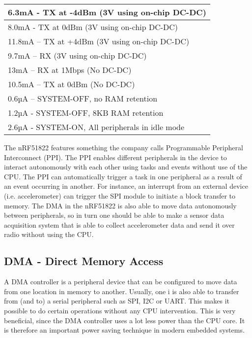 \begin{center}
    \begin{tabular}{| l |}
    \hline
    6.3mA - TX at -4dBm (3V using on-chip DC-DC) \\ \hline
    8.0mA - TX at 0dBm (3V using on-chip DC-DC) \\ \hline
    11.8mA – TX at +4dBm (3V using on-chip DC-DC) \\ \hline
    9.7mA – RX (3V using on-chip DC-DC) \\ \hline
    13mA – RX at 1Mbps (No DC-DC) \\ \hline
    10.5mA – TX at 0dBm (No DC-DC) \\ \hline
    0.6µA – SYSTEM-OFF, no RAM retention \\ \hline
    1.2µA - SYSTEM-OFF, 8KB RAM retention \\ \hline
    2.6µA - SYSTEM-ON, All peripherals in idle mode \\ \hline
    \end{tabular}
\end{center}

The nRF51822 features something the company calls Programmable Peripheral Interconnect (PPI). The PPI enables different peripherals in the device to interact autonomously with each other using tasks and events without use of the CPU. The PPI can automatically trigger a task in one peripheral as a result of an event occurring in another. For instance, an interrupt from an external device (i.e. accelerometer) can trigger the SPI module to initiate a block transfer to memory. The DMA in the nRF51822 is also able to move data autonomously between peripherals, so in turn one should be able to make a sensor data acquisition system that is able to collect accelerometer data and send it over radio without using the CPU.

\subsection{DMA - Direct Memory Access}

A DMA controller is a peripheral device that can be configured to move data from one location in memory to another. Usually, one i is also able to transfer from (and to) a serial peripheral such as SPI, I2C or UART. This makes it possible to do certain operations without any CPU intervention. This is very beneficial, since the DMA controller uses a lot less power than the CPU core. It is therefore an important power saving technique in modern embedded systems.  

